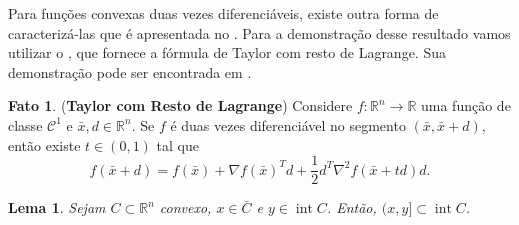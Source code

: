 \documentclass[12pt,a4paper]{scrartcl}
\DeclareMathOperator{\interior}{int}
\def\RR{\mathds{R}}
\def\xbar{\bar{x}}
\newtheorem{lema}{Lema}
\theoremstyle{definition}%
\newtheorem{fato}{Fato}
\begin{document}
Para funções convexas duas vezes diferenciáveis, existe outra forma de caracterizá-las que é apresentada no . Para a demonstração desse resultado vamos utilizar o , que fornece a fórmula de Taylor com resto de Lagrange. Sua demonstração pode ser encontrada em \textcite[p.196]{Elon2019}.

\begin{fato}(\textbf{Taylor com Resto de Lagrange}) \label{fato:Taylor_com_resto_lagrange}
Considere $f: \RR^{n} \rightarrow \RR$ uma função de classe $\mathcal{C}^{1}$ e $\xbar, d \in \RR^{n}$. Se $f$ é duas vezes diferenciável no segmento $(\xbar , \xbar + d)$, então existe $t \in (0,1)$ tal que
\[{}
f(\xbar + d) = f(\xbar) + \nabla f(\xbar)^{T} d + \dfrac{1}{2}d^{T}\nabla^{2} f(\xbar + td)d .
\]
\end{fato}

\begin{lema} \label{lema:auxiliar_para_teo_hessiana_convexidade}
Sejam $C \subset \RR^{n}$ convexo, $x \in \bar{C}$ e $y \in \interior C$. Então, $(x,y] \subset \interior C$.
\end{lema}
\end{document}
